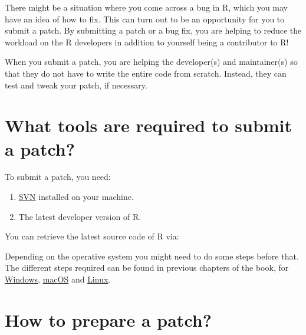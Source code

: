 \documentclass[
]{book}
\newenvironment{Shaded}{\begin{snugshade}}{\end{snugshade}}
\newcommand{\BuiltInTok}[1]{#1}
\newcommand{\FunctionTok}[1]{\textcolor[rgb]{0.00,0.00,0.00}{#1}}
\newcommand{\NormalTok}[1]{#1}
\newcommand{\OperatorTok}[1]{\textcolor[rgb]{0.81,0.36,0.00}{\textbf{#1}}}
\newcommand{\StringTok}[1]{\textcolor[rgb]{0.31,0.60,0.02}{#1}}
\newcommand{\VariableTok}[1]{\textcolor[rgb]{0.00,0.00,0.00}{#1}}
\begin{document}
There might be a situation where you come across a bug in R, which you may have an idea of how to fix. This can turn out to be an opportunity for you to submit a patch. By submitting a patch or a bug fix, you are helping to reduce the workload on the R developers in addition to yourself being a contributor to R!

When you submit a patch, you are helping the developer(s) and maintainer(s) so that they do not have to write the entire code from scratch. Instead, they can test and tweak your patch, if necessary.

\hypertarget{what-tools-are-required-to-submit-a-patch}{%
\section{What tools are required to submit a patch?}\label{what-tools-are-required-to-submit-a-patch}}

To submit a patch, you need:

\begin{enumerate}
\def\labelenumi{\arabic{enumi}.}
\item
  \href{http://subversion.apache.org/}{SVN} installed on your machine.
\item
  The latest developer version of R.
\end{enumerate}

You can retrieve the latest source code of R via:

\begin{Shaded}
\end{Shaded}

Depending on the operative system you might need to do some steps before that.
The different steps required can be found in previous chapters of the book, for \protect\hyperlink{windowsSource}{Windows}, \protect\hyperlink{macos}{macOS} and \protect\hyperlink{linux}{Linux}.

\hypertarget{how-to-prepare-a-patch}{%
\section{How to prepare a patch?}\label{how-to-prepare-a-patch}}
\end{document}
